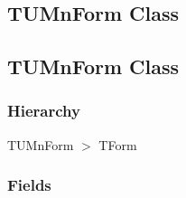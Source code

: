 \documentclass{report}
\begin{document}
\subsection*{\large{\textbf{TUMnForm Class}}\normalsize\hspace{1ex}\hrulefill}
\else
\subsection*{TUMnForm Class}
\fi
\label{mnupdate.TUMnForm}
\subsubsection*{\large{\textbf{Hierarchy}}\normalsize\hspace{1ex}\hfill}
TUMnForm {$>$} TForm
\subsubsection*{\large{\textbf{Fields}}\normalsize\hspace{1ex}\hfill}
\end{document}
